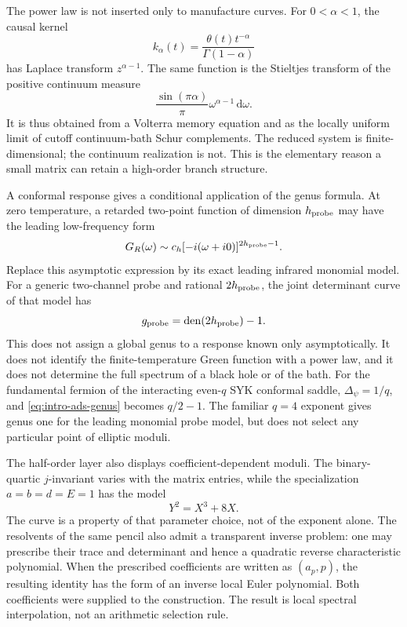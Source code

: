 \documentclass[11pt,reqno]{amsart}
\theoremstyle{remark}
\newcommand{\den}{\operatorname{den}}
\newcommand{\dd}{\,\mathrm d}
\begin{document}
The power law is not inserted only to manufacture curves.  For
$0<\alpha<1$, the causal kernel
\begin{equation}\label{eq:intro-memory-kernel}
 k_\alpha(t)=\frac{\theta(t)t^{-\alpha}}{\Gamma(1-\alpha)}
\end{equation}
has Laplace transform $z^{\alpha-1}$.  The same function is the Stieltjes
transform of the positive continuum measure
\begin{equation}\label{eq:intro-stieltjes}
 \frac{\sin(\pi\alpha)}{\pi}\omega^{\alpha-1}\dd\omega.
\end{equation}
It is thus obtained from a Volterra memory equation and as the locally
uniform limit of cutoff continuum-bath Schur complements.  The reduced
system is finite-dimensional; the continuum realization is not.  This is the
elementary reason a small matrix can retain a high-order branch structure.

A conformal response gives a conditional application of the genus formula.
At zero temperature, a retarded two-point function of
dimension $h_{\rm probe}$ may have the leading low-frequency form
\begin{equation}\label{eq:intro-conformal}
 G_R(\omega)\sim c_h[-i(\omega+i0)]^{2h_{\rm probe}-1}.
\end{equation}
Replace this asymptotic expression by its exact leading infrared monomial
model.  For a generic two-channel probe and rational $2h_{\rm probe}$, the
joint determinant curve of that model has
\begin{equation}\label{eq:intro-ads-genus}
 g_{\mathrm{probe}}=\den(2h_{\rm probe})-1.
\end{equation}
This does not assign a global genus to a response known only asymptotically.
It does not identify the finite-temperature Green function with a power law,
and it does not determine the full spectrum of a black hole or of the bath.
For the fundamental fermion of the interacting even-$q$ SYK conformal saddle,
$\Delta_\psi=1/q$, and \eqref{eq:intro-ads-genus} becomes $q/2-1$.  The
familiar $q=4$ exponent gives genus one for the leading monomial probe model,
but does not select any particular point of elliptic moduli.

The half-order layer also displays coefficient-dependent moduli.  The
binary-quartic $j$-invariant varies with the matrix entries, while the
specialization $a=b=d=E=1$ has the model
\begin{equation}\label{eq:intro-canonical-elliptic}
 Y^2=X^3+8X.
\end{equation}
The curve is a property of that parameter choice, not of the exponent alone.
The resolvents of the same pencil also admit a transparent inverse problem:
one may prescribe their trace and determinant and hence a quadratic reverse
characteristic polynomial.  When the prescribed coefficients are written
as $(a_p,p)$, the resulting identity has the form of an inverse local Euler
polynomial.  Both coefficients were supplied to the construction.  The
result is local spectral interpolation, not an arithmetic selection rule.
\end{document}
